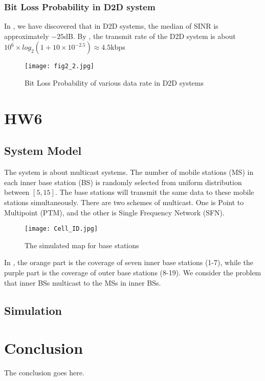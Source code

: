 \documentclass[conference]{IEEEtran}
\begin{document}
\subsubsection{Bit Loss Probability in D2D system}
In , we have discovered that in D2D systems, the median of SINR is approximately $-25$dB. By , the transmit rate of the D2D system is about $10^6 \times log_2(1+ 10 \times 10^{-2.5}) \approx 4.5$kbps
\begin{figure}[htbp]
    \centering
    \texttt{[image: fig2\_2.jpg]}
    \caption{Bit Loss Probability of various data rate in D2D systems}
    \label{fig:bit_d2d}
\end{figure}
\section{HW6}

\subsection{System Model}
The system is about multicast systems. The number of mobile stations (MS) in each inner base station (BS) is randomly selected from uniform distribution between $[5, 15]$. The base stations will transmit the same data to these mobile stations simultaneously. There are two schemes of multicast. One is Point to Multipoint (PTM), and the other is Single Frequency Network (SFN).
\begin{figure}[htbp]
    \centering
    \texttt{[image: Cell\_ID.jpg]}
    \caption{The simulated map for base stations}
    \label{fig:bs_map}
\end{figure}
In , the orange part is the coverage of seven inner base stations (1-7), while the purple part is the coverage of outer base stations (8-19). We consider the problem that inner BSs multicast to the MSs in inner BSs.
\subsection{Simulation}

\section{Conclusion}
The conclusion goes here.
\end{document}
